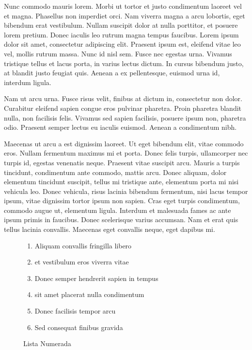 \documentclass[a4paper,twoside=false,12pt,spanish,DIV=7]{scrbook}
\begin{document}
Nunc commodo mauris lorem. Morbi ut tortor et justo condimentum laoreet vel et magna. Phasellus non imperdiet orci. Nam viverra magna a arcu lobortis, eget bibendum erat vestibulum. Nullam suscipit dolor at nulla porttitor, et posuere lorem pretium. Donec iaculis leo rutrum magna tempus faucibus. Lorem ipsum dolor sit amet, consectetur adipiscing elit. Praesent ipsum est, eleifend vitae leo vel, mollis rutrum massa. Nunc id nisl sem. Fusce nec egestas urna. Vivamus tristique tellus et lacus porta, in varius lectus dictum. In cursus bibendum justo, at blandit justo feugiat quis. Aenean a ex pellentesque, euismod urna id, interdum ligula.

Nam ut arcu urna. Fusce risus velit, finibus at dictum in, consectetur non dolor. Curabitur eleifend sapien congue eros pulvinar pharetra. Proin pharetra blandit nulla, non facilisis felis. Vivamus sed sapien facilisis, posuere ipsum non, pharetra odio. Praesent semper lectus eu iaculis euismod. Aenean a condimentum nibh.

Maecenas ut arcu a est dignissim laoreet. Ut eget bibendum elit, vitae commodo eros. Nullam fermentum maximus mi et porta. Donec felis turpis, ullamcorper nec turpis id, egestas venenatis neque. Praesent vitae suscipit arcu. Mauris a turpis tincidunt, condimentum ante commodo, mattis arcu. Donec aliquam, dolor elementum tincidunt suscipit, tellus mi tristique ante, elementum porta mi nisi vehicula leo. Donec vehicula, risus lacinia bibendum fermentum, nisi lacus tempor ipsum, vitae dignissim tortor ipsum non sapien. Cras eget turpis condimentum, commodo augue ut, elementum ligula. Interdum et malesuada fames ac ante ipsum primis in faucibus. Donec scelerisque varius accumsan. Nam et erat quis tellus lacinia convallis. Maecenas eget convallis neque, eget dapibus mi.

\begin{figure}[h]

\begin{enumerate}
\item Aliquam convallis fringilla libero
\item et vestibulum eros viverra vitae
\item Donec semper hendrerit sapien in tempus
\item sit amet placerat nulla condimentum
\item Donec facilisis tempor arcu
\item Sed consequat finibus gravida
\end{enumerate}
\caption{Lista Numerada}
\end{figure}
\end{document}
